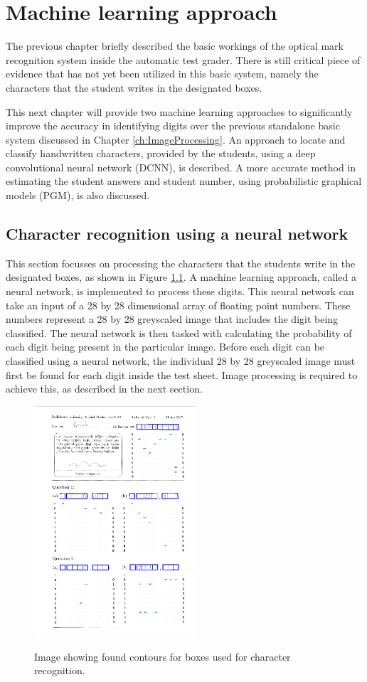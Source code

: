 \chapter{Machine learning approach}
\label{ch:MachineLearning}
\graphicspath{{Chapter4/Chapter4Figures/}}

The previous chapter briefly described the basic workings of the optical mark recognition system inside the automatic test grader. There is still critical piece of evidence that has not yet been utilized in this basic system, namely the characters that the student writes in the designated boxes.

This next chapter will provide two machine learning approaches to significantly improve the accuracy in identifying digits over the previous standalone basic system discussed in Chapter \ref{ch:ImageProcessing}. An approach to locate and classify handwritten characters, provided by the students, using a deep convolutional neural network (DCNN), is described. A more accurate method in estimating the  student answers and student number, using probabilistic  graphical models (PGM), is also discussed. 

\section{Character recognition using a neural network}

This section focusses on processing the characters that the students write in the designated boxes, as shown in Figure \ref{fig:sa}. A machine learning approach, called a neural network, is implemented to process these digits. This neural network can take an input of a 28 by 28 dimensional array of floating point numbers. These numbers represent a 28 by 28 greyscaled image that includes the digit being classified. The neural network is then tasked with calculating the probability of each digit being present in the particular image. Before each digit can be classified using a neural network, the individual 28 by 28 greyscaled image must first be found for each digit inside the test sheet. Image processing is required to achieve this, as described in the next section.
\begin{figure}
  \centering
  \includegraphics[width=6cm]{DigitScan}\\
  \caption{Image showing found contours for boxes used for character recognition.}
  \label{fig:sa}
\end{figure}

